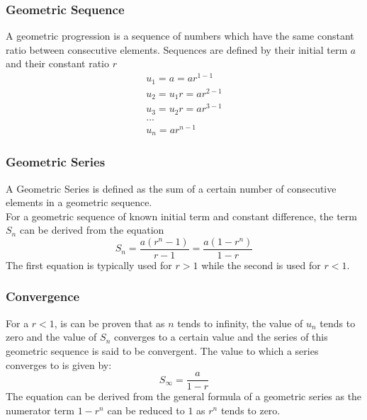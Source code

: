 \documentclass[../main]{subfiles}
\begin{document}
	\subsubsection{Geometric Sequence}
	A geometric progression is a sequence of numbers which have the same constant ratio between consecutive elements. Sequences are defined by their initial term \(a\) and their constant ratio \(r\)
	\begin{equation*} \begin{gathered}
		u_1 = a = ar^{1-1}\\
		u_2 = u_1r = ar^{2-1}\\
		u_3 = u_2r = ar^{3-1} \\
		...\\
		u_n = ar^{n-1}
	\end{gathered} \end{equation*} 
	\subsubsection{Geometric Series}
	A Geometric Series is defined as the sum of a certain number of consecutive elements in a geometric sequence. \\
	For a geometric sequence of known initial term and constant difference, the term \(S_n\) can be derived from the equation
	\[ S_n = \frac{a(r^n-1)}{r-1} = \frac{a(1-r^n)}{1-r} \]
	The first equation is typically used for \(r>1\) while the second is used for \(r<1\).
	\subsubsection{Convergence}
	For a \(r<1\), is can be proven that as \(n\) tends to infinity, the value of \(u_n\) tends to zero and the value of \(S_n\) converges to a certain value and the series of this geometric sequence is said to be convergent. The value to which a series converges to is given by:
	\[ S_{\infty} = \frac{a}{1-r} \]
	The equation can be derived from the general formula of a geometric series as the numerator term \(1-r^n\) can be reduced to \(1\) as \(r^n\) tends to zero.
\end{document}
